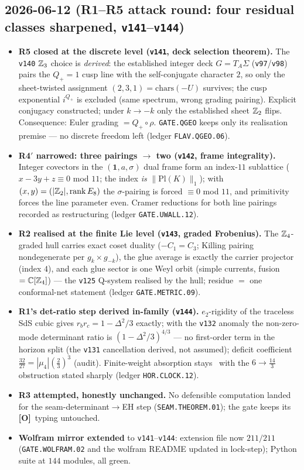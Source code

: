 \documentclass[11pt]{article}
\providecommand{\mO}{\textbf{[O]}}\providecommand{\mX}{\textbf{[X]}}
\providecommand{\vref}[1]{\texttt{#1}}
\begin{document}
\subsection*{2026-06-12 (R1--R5 attack round: four residual classes sharpened, \vref{v141}--\vref{v144})}
\begin{itemize}
\item \textbf{R5 closed at the discrete level (\vref{v141}, deck selection theorem).} The
  \vref{v140} $\mathbb{Z}_3$ choice is \emph{derived}: the established integer deck $G=T_A\Sigma$
  (\vref{v97}/\vref{v98}) pairs the $Q_+{=}1$ cusp line with the self-conjugate character
  $2$, so only the sheet-twisted assignment $(2,3,1)=\mathrm{chars}(-U)$ survives; the cusp
  exponential $i^{Q_+}$ is excluded (same spectrum, wrong grading pairing). Explicit
  conjugacy constructed; under $k\to-k$ only the established sheet $\mathbb{Z}_2$ flips.
  Consequence: Euler grading $=Q_+\!\circ\rho$. \texttt{GATE.QGEO} keeps only its
  realisation premise --- no discrete freedom left (ledger \texttt{FLAV.QGEO.06}).
\item \textbf{R4$'$ narrowed: three pairings $\to$ two (\vref{v142}, frame integrality).}
  Integer covectors in the $(\mathbf1,a,\sigma)$ dual frame form an index-$11$ sublattice
  ($x-3y+z\equiv0$ mod $11$; the index \emph{is} $\|\mathrm{Pl}(K)\|_1$); with
  $(x,y)=(|\mathbb{Z}_2|,\mathrm{rank}\,E_8)$ the $\sigma$-pairing is forced $\equiv0$ mod $11$,
  and primitivity forces the line parameter even. Cramer reductions for both line pairings
  recorded as restructuring (ledger \texttt{GATE.UWALL.12}).
\item \textbf{R2 realised at the finite Lie level (\vref{v143}, graded Frobenius).} The
  $\mathbb{Z}_4$-graded hull carries exact coset duality ($-C_1=C_3$; Killing pairing nondegenerate
  per $g_k\times g_{-k}$), the glue average is exactly the carrier projector (index $4$),
  and each glue sector is one Weyl orbit (simple currents, fusion $=\mathbb C[\mathbb{Z}_4]$) ---
  the \vref{v125} Q-system realised by the hull; residue $=$ one conformal-net statement
  (ledger \texttt{GATE.METRIC.09}).
\item \textbf{R1's det-ratio step derived in-family (\vref{v144}).} $e_2$-rigidity of the
  traceless SdS cubic gives $r_br_c=1-\Delta^2/3$ exactly; with the \vref{v132} anomaly the
  non-zero-mode determinant ratio is $(1-\Delta^2/3)^{4/3}$ --- no first-order term in the
  horizon split (the \vref{v131} cancellation derived, not assumed); deficit coefficient
  $\tfrac{32}{27}=|\mu_4|(\tfrac23)^3$ (audit). Finite-weight absorption stays \mC\ with the
  $6\to\tfrac{14}3$ obstruction stated sharply (ledger \texttt{HOR.CLOCK.12}).
\item \textbf{R3 attempted, honestly unchanged.} No defensible computation landed for the
  seam-determinant$\to$EH step (\texttt{SEAM.THEOREM.01}); the gate keeps its \mO\ typing
  untouched.
\item \textbf{Wolfram mirror extended} to \vref{v141}--\vref{v144}: extension file now
  $211/211$ (\texttt{GATE.WOLFRAM.02} and the wolfram README updated in lock-step); Python
  suite at $144$ modules, all green.
\end{itemize}
\end{document}
